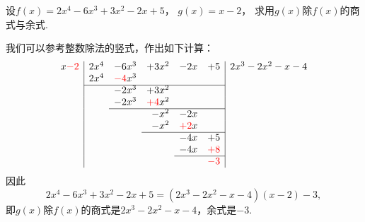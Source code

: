 \begin{example}
设\(f(x) = 2x^4-6x^3+3x^2-2x+5\)，
\(g(x) = x-2\)，
求用\(g(x)\)除\(f(x)\)的商式与余式.
\begin{solution}我们可以参考整数除法的竖式，作出如下计算：
\[
	\begin{array}{r|*5r|l}
		x{\color{red}-2} &
		2x^4 & -6x^3 & +3x^2 & -2x & +5
		& 2x^3-2x^2-x-4 \\
		& 2x^4 & {\color{red}-4}x^3 &&&& \\ \cline{2-6}
		&& -2x^3 & +3x^2 &&& \\
		&& -2x^3 & {\color{red}+4}x^2 &&& \\ \cline{3-6}
		&&& -x^2 & -2x && \\
		&&& -x^2 & {\color{red}+2}x && \\ \cline{4-6}
		&&&& -4x & +5 & \\
		&&&& -4x & {\color{red}+8} & \\ \cline{5-6}
		&&&&& {\color{red}-3}
	\end{array}
\]
因此\[
	2x^4-6x^3+3x^2-2x+5
	=(2x^3-2x^2-x-4)(x-2)-3,
\]
即\(g(x)\)除\(f(x)\)的商式是\(2x^3-2x^2-x-4\)，余式是\(-3\).
\end{solution}
\end{example}
